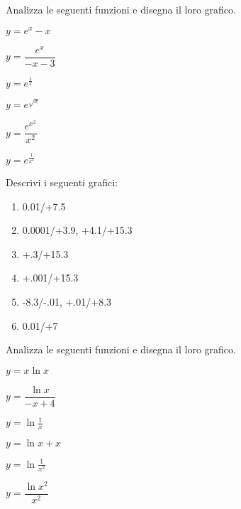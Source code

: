 \begin{esercizio}\label{ese:stufun.5e}
Analizza le seguenti funzioni e disegna il loro grafico.
\begin{multicols}{3}
 \begin{enumeratea}
  \item \(y = e^x-x\) %
  \item \(y = \dfrac{e^x}{-x -3}\) %
  \item \(y = e^{\frac{1}{x}}\) \\ [.5em] %
  \item \(y = e^{\sqrt{x}}\) \\ %
  \item \(y = \dfrac{e^{x^2}}{x^2}\) %
  \item \(y = e^{\frac{1}{x^2}}\) \\ %
 \end{enumeratea}
\end{multicols}
\end{esercizio}

\bigskip

\begin{esercizio}\label{ese:stufun.6g}
Descrivi i seguenti grafici:
\begin{multicols}{2}
 \begin{enumerate} [left=0pt, label=\alph*)]
  \item \myp 
{}
{0.01/+7.5} %
  \item \myp 
{} 
{0.0001/+3.9, +4.1/+15.3} %
  \item \myp 
{} 
{+.3/+15.3} %
\vspace{1mm}
  \item \myp 
{}
{+.001/+15.3} %
  \item \myp 
{}
{-8.3/-.01, +.01/+8.3} %
  \item \myp 
{}
{0.01/+7} %
 \end{enumerate}
\end{multicols}
\end{esercizio}

\begin{esercizio}\label{ese:stufun.6e}
Analizza le seguenti funzioni e disegna il loro grafico.
\begin{multicols}{3}
 \begin{enumeratea}
  \item \(y = x \ln x\) \\ %
  \item \(y = \dfrac{\ln x}{-x +4}\) %
  \item \(y = \ln \frac{1}{x}\) \\ [.5em] %
  \item \(y = \ln x +x\) %
  \item \(y = \ln {\frac{1}{x^2}}\) \\ %
  \item \(y = \dfrac{\ln{x^2}}{x^2}\) %
 \end{enumeratea}
\end{multicols}
\end{esercizio}

